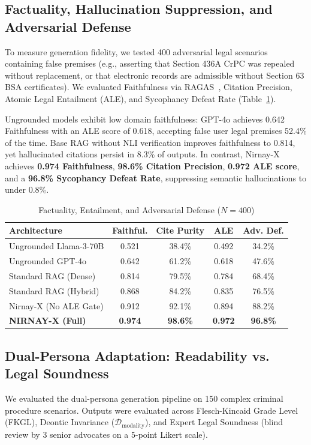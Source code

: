 \documentclass[conference]{IEEEtran}
\begin{document}
\subsection{Factuality, Hallucination Suppression, and Adversarial Defense}
To measure generation fidelity, we tested 400 adversarial legal scenarios containing false premises (e.g., asserting that Section 436A CrPC was repealed without replacement, or that electronic records are admissible without Section 63 BSA certificates). We evaluated Faithfulness via RAGAS~\cite{es2024ragas}, Citation Precision, Atomic Legal Entailment (ALE), and Sycophancy Defeat Rate (Table~\ref{tab:factuality}).

Ungrounded models exhibit low domain faithfulness: GPT-4o achieves 0.642 Faithfulness with an ALE score of 0.618, accepting false user legal premises 52.4\% of the time. Base RAG without NLI verification improves faithfulness to 0.814, yet hallucinated citations persist in 8.3\% of outputs. In contrast, Nirnay-X achieves \textbf{0.974 Faithfulness}, \textbf{98.6\% Citation Precision}, \textbf{0.972 ALE score}, and a \textbf{96.8\% Sycophancy Defeat Rate}, suppressing semantic hallucinations to under 0.8\%.

\begin{table}[!t]
\caption{Factuality, Entailment, and Adversarial Defense ($N=400$)}
\label{tab:factuality}
\centering
\footnotesize
\setlength{\tabcolsep}{2.5pt}
\begin{tabularx}{\columnwidth}{>{\raggedright\arraybackslash}Xcccc}
\toprule
\textbf{Architecture} & \textbf{Faithful.} & \textbf{Cite Purity} & \textbf{ALE} & \textbf{Adv. Def.} \\
\midrule
Ungrounded Llama-3-70B & 0.521 & 38.4\% & 0.492 & 34.2\% \\
Ungrounded GPT-4o & 0.642 & 61.2\% & 0.618 & 47.6\% \\
Standard RAG (Dense) & 0.814 & 79.5\% & 0.784 & 68.4\% \\
Standard RAG (Hybrid) & 0.868 & 84.2\% & 0.835 & 76.5\% \\
Nirnay-X (No ALE Gate) & 0.912 & 92.1\% & 0.894 & 88.2\% \\
\midrule
\textbf{NIRNAY-X (Full)} & \textbf{0.974} & \textbf{98.6\%} & \textbf{0.972} & \textbf{96.8\%} \\
\bottomrule
\end{tabularx}
\end{table}

\subsection{Dual-Persona Adaptation: Readability vs. Legal Soundness}
We evaluated the dual-persona generation pipeline on 150 complex criminal procedure scenarios. Outputs were evaluated across Flesch-Kincaid Grade Level (FKGL), Deontic Invariance ($\mathcal{D}_{\text{modality}}$), and Expert Legal Soundness (blind review by 3 senior advocates on a 5-point Likert scale).
\end{document}
